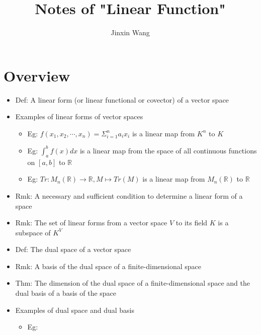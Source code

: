 \documentclass[onecolumn]{ctexart}
\title{Notes of "Linear Function"}
\author{Jinxin Wang}
\date{}
\begin{document}
\maketitle

\section{Overview}
\begin{itemize}
  \item Def: A linear form (or linear functional or covector) of a vector space
  \item Examples of linear forms of vector spaces
  \begin{itemize}
    \item Eg: $f(x_1, x_2, \cdots, x_n) = \Sigma_{i=1}^n a_ix_i$ is a linear map from $K^n$ to $K$
    \item Eg: $\int_a^b f(x)dx$ is a linear map from the space of all continuous functions on $\left[ a, b \right]$ to $\mathbb{R}$
    \item Eg: $Tr: M_n(\mathbb{R}) \to \mathbb{R}, M \mapsto Tr(M)$ is a linear map from $M_n(\mathbb{R})$ to $\mathbb{R}$
  \end{itemize}
  \item Rmk: A necessary and sufficient condition to determine a linear form of a space
  \item Rmk: The set of linear forms from a vector space $V$ to its field $K$ is a subspace of $K^V$
  \item Def: The dual space of a vector space
  \item Rmk: A basis of the dual space of a finite-dimensional space
  \item Thm: The dimension of the dual space of a finite-dimensional space and the dual basis of a basis of the space
  \item Examples of dual space and dual basis
  \begin{itemize}
    \item Eg:
  \end{itemize}
\end{itemize}
\end{document}
